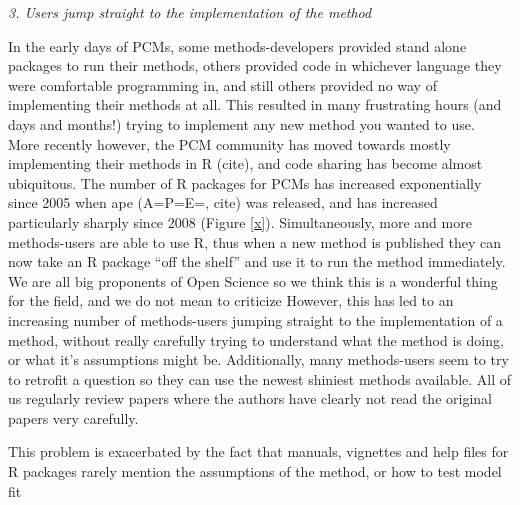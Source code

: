 \documentclass[a4paper,12pt]{article}
\renewcommand{\subsection}[1]{
  \bigskip
  \begin{center}
  \begin{large}
  \normalfont\itshape #1
  \end{large}
  \end{center}
}
\begin{document}
\subsection{3. Users jump straight to the implementation of the method}

In the early days of PCMs, some methods-developers provided stand alone packages to run their methods, others provided code in whichever language they were comfortable programming in, and still others provided no way of implementing their methods at all. 
This resulted in many frustrating hours (and days and months!) trying to implement any new method you wanted to use.\\

More recently however, the PCM community has moved towards mostly implementing their methods in R (cite), and code sharing has become almost ubiquitous. 
The number of R packages for PCMs has increased exponentially since 2005 when ape (A=P=E=, cite) was released, and has increased particularly sharply since 2008 (Figure \ref{x}).
Simultaneously, more and more methods-users are able to use R, thus when a new method is published they can now take an R package ``off the shelf'' and use it to run the method immediately.
We are all big proponents of Open Science so we think this is a wonderful thing for the field, and we do not mean to criticize 
However, this has led to an increasing number of methods-users jumping straight to the implementation of a method, without really carefully trying to understand what the method is doing, or what it's assumptions might be. 
Additionally, many methods-users seem to try to retrofit a question so they can use the newest shiniest methods available. 
All of us regularly review papers where the authors have clearly not read the original papers very carefully.

This problem is exacerbated by the fact that manuals, vignettes and help files for R packages rarely mention the assumptions of the method, or how to test model fit


\end{document}
